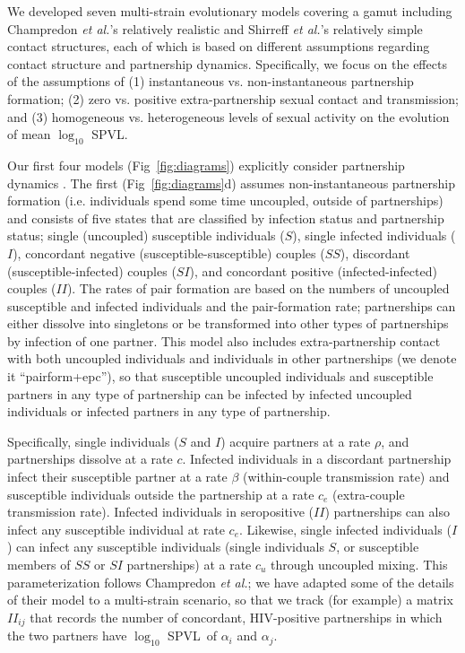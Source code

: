 \documentclass[10pt,letterpaper]{article}
\renewcommand{\figurename}{Fig}
\newcommand{\Lspvl}{$\log_{10}$ SPVL}
\newcommand{\etal}{\textit{et al.}}
\newcommand{\diagfig}[1]{\figurename~\ref{fig:diagrams}#1}
\begin{document}
We developed seven multi-strain evolutionary models covering a gamut including Champredon \etal's relatively realistic \cite{champredon_hiv_2013} and Shirreff \etal's relatively simple \cite{shirreff_transmission_2011} contact structures, each of which is based on different assumptions regarding contact structure and partnership dynamics. Specifically, we focus on the effects of the assumptions of (1) instantaneous vs. non-instantaneous partnership formation; (2) zero vs. positive extra-partnership sexual contact and transmission; and (3) homogeneous vs. heterogeneous levels of sexual activity on the evolution of mean \Lspvl.

Our first four models (\figurename~\ref{fig:diagrams}) explicitly consider partnership dynamics \cite{champredon_hiv_2013}. The first (\diagfig{d}) assumes non-instantaneous partnership formation (i.e. individuals spend some time uncoupled, outside of partnerships) and consists of five states that are classified by infection status and partnership status; single (uncoupled) susceptible individuals ($S$), single infected individuals ($I$), concordant negative (susceptible-susceptible) couples ($SS$), discordant (susceptible-infected) couples ($SI$), and concordant positive (infected-infected) couples ($II$). 
The rates of pair formation are based on the numbers of uncoupled susceptible and infected individuals and the pair-formation rate; partnerships can either dissolve into singletons or be transformed into other types of partnerships by infection of one partner. This model also includes extra-partnership contact with both uncoupled individuals and individuals in other partnerships (we denote it ``pairform+epc''), so that susceptible uncoupled individuals and susceptible partners in any type of partnership can be infected by infected uncoupled individuals or infected partners in any type of partnership.
 
Specifically, single individuals ($S$ and $I$) acquire partners at a rate $\rho$, and partnerships dissolve at a rate $c$. Infected individuals in a discordant partnership infect their susceptible partner at a rate $\beta$ (within-couple transmission rate) and susceptible individuals outside the partnership at a rate $c_e$ (extra-couple transmission rate). Infected individuals in seropositive ($II$) partnerships can also infect any susceptible individual at rate $c_e$. Likewise, single infected individuals ($I$) can infect any susceptible individuals (single individuals $S$, or susceptible members of $SS$ or $SI$ partnerships) at a rate $c_u$ through uncoupled mixing. 
This parameterization follows Champredon \etal; we have adapted some of the details
of their model to a multi-strain scenario, so that we track (for example) a matrix 
$II_{ij}$ that records the number of concordant, HIV-positive partnerships in which the two partners have \Lspvl\ of $\alpha_i$ and $\alpha_j$. 
\end{document}
